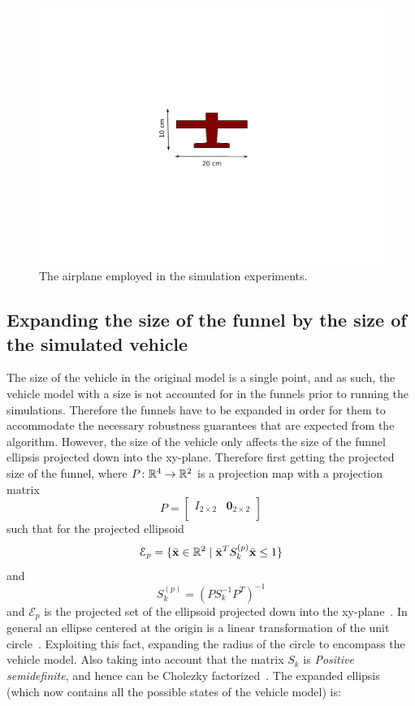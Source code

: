 \begin{figure}
  \centering \includegraphics[trim={5cm 5cm 5cm 5cm},
  width=\textwidth]{figures/experiments/radio-vehicle-model}
  \caption{The airplane employed in the simulation experiments.}
  \label{fig:radio-vehicle}
\end{figure}

\subsection{Expanding the size of the funnel by the size of the simulated
  vehicle}
\label{subsec:expand-funnel}

The size of the vehicle in the original model is a single point, and as such,
the vehicle model with a size is not accounted for in the funnels prior to
running the simulations. Therefore the funnels have to be expanded in order for
them to accommodate the necessary robustness guarantees that are expected from
the algorithm. However, the size of the vehicle only affects the size of the
funnel ellipsis projected down into the xy-plane. Therefore first getting the
projected size of the funnel, where \(P \colon \mathbb{R}^4 \rightarrow \mathbb{R}^2\) is a
projection map with a projection matrix
\[
  P =
  \begin{bmatrix}
    I_{2 \times 2} & \mathbf{0}_{2 \times 2} \\
  \end{bmatrix}
\]
such that for the projected ellipsoid
\[
  \mathcal{E}_{p} = \lbrace\bar{\mathbf{x}} \in \mathbb{R}^{2} \mid {\bar{\mathbf{x}}}^{T}S_{k}^{(p)}\bar{\mathbf{x}}
    \leq 1\rbrace
\]
and
\[
  S_{k}^{(p)} = {\left( PS_{k}^{-1}P^T \right)}^{-1}
\]
and \(\mathcal{E}_{p}\) is the projected set of the ellipsoid projected down
into the xy-plane~\cite{majumdarFunnelLibrariesRealtime2017}. In general an
ellipse centered at the origin is a linear transformation of the unit
circle~\cite{lay2005linear}. Exploiting this fact, expanding the radius of the
circle to encompass the vehicle model. Also taking into account that the matrix
\(S_{k}\) is \textit{Positive semidefinite}, and hence can be Cholezky
factorized~\cite{lay2005linear}. The expanded ellipsis (which now contains all
the possible states of the vehicle model) is:

